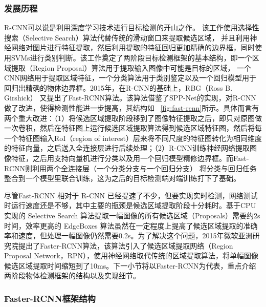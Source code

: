 \subsubsection{发展历程}
R-CNN可以说是利用深度学习技术进行目标检测的开山之作。 该工作使用选择性搜索（Selective Search）算法\cite{UijlingsSelective}代替传统的滑动窗口来提取候选区域， 并且利用神经网络对图片进行特征提取，然后利用提取的特征回归更加精确的边界框，同时使用SVMs进行类别判断。该工作奠定了两阶段目标检测框架的基本结构，即一个区域提取（Region Proposal）算法用于提取输入图像中可能是目标的区域， 一个CNN网络用于提取区域特征，一个分类算法用于类别鉴定以及一个回归模型用于回归出精确的物体边界框。2015年，在R-CNN的基础上，RBG（Ross B. Girshick） 又提出了Fast-RCNN算法。该算法借鉴了SPP-Net\cite{7005506}的实现，对R-CNN做了改进，使得检测性能进一步提高，其结构如 \figurename \, \ref{fig:fast-rcnn}所示。具体而言有两个重大改进：（1）将候选区域提取阶段移到了图像特征提取之后，即只对原图做一次卷积，然后在特征图上运行候选区域提取算法得到候选区域特征图，然后将每一个特征图输入RoI（region of interest）层来将不同尺度的特征图转化为相同维度的特征向量，之后送入全连接层进行后续处理；（2）R-CNN训练神经网络提取图像特征，之后用支持向量机进行分类以及用一个回归模型精修边界框。而Fast-RCNN则利用两个全连接层（一个分类分支与一个回归分支） 将分类与回归任务整合到一个模型里联合训练，这为之后的目标检测端对端训练打下了基础。



尽管Fast-RCNN 相对于 R-CNN 已经提速了不少，但要实现实时检测，网络测试时运行速度还是不够，其中主要的瓶颈是候选区域提取阶段十分耗时。基于CPU实现的 Selective Search 算法提取一幅图像的所有候选区域（Proposals）需要约2s时间，效率更高的 EdgeBoxes\cite{Zitnick2014Edge} 算法虽然在一定程度上提高了候选区域提取的准确率和速度，但处理一幅图像仍然需要0.2s。为了解决这个问题，2015年微软亚洲研究院提出了Faster-RCNN算法，该算法引入了候选区域提取网络（Region Proposal Network，RPN），使用神经网络取代传统的区域提取算法，将单幅图像候选区域提取时间缩短到了10ms。下一小节将以Faster-RCNN为代表，重点介绍两阶段物体检测框架的结构以及实现细节。

\subsubsection{Faster-RCNN框架结构}



